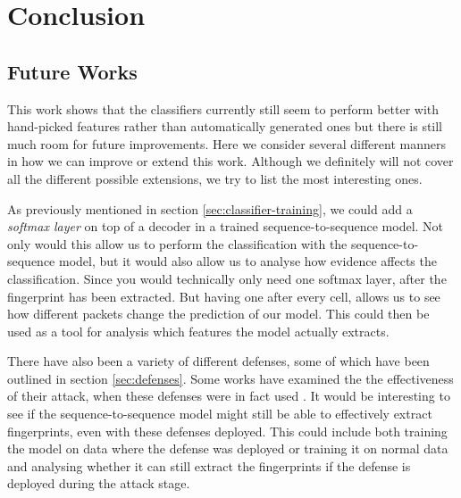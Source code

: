 \chapter{Conclusion}



\section{Future Works} \label{sec:future-works}

This work shows that the classifiers currently still seem to perform better with hand-picked features rather than automatically generated ones but there is still much room for future improvements.
Here we consider several different manners in how we can improve or extend this work.
Although we definitely will not cover all the different possible extensions, we try to list the most interesting ones.

As previously mentioned in section \ref{sec:classifier-training}, we could add a \textit{softmax layer} on top of a decoder in a trained sequence-to-sequence model.
Not only would this allow us to perform the classification with the sequence-to-sequence model, but it would also allow us to analyse how evidence affects the classification.
Since you would technically only need one softmax layer, after the fingerprint has been extracted.
But having one after every cell, allows us to see how different packets change the prediction of our model.
This could then be used as a tool for analysis which features the model actually extracts.

There have also been a variety of different defenses, some of which have been outlined in section \ref{sec:defenses}.
Some works have examined the the effectiveness of their attack, when these defenses were in fact used \cite{kfingerprinting,wang_cai_johnson_nithyanand_goldberg_2014}.
It would be interesting to see if the sequence-to-sequence model might still be able to effectively extract fingerprints, even with these defenses deployed.
This could include both training the model on data where the defense was deployed or training it on normal data and analysing whether it can still extract the fingerprints if the defense is deployed during the attack stage.

